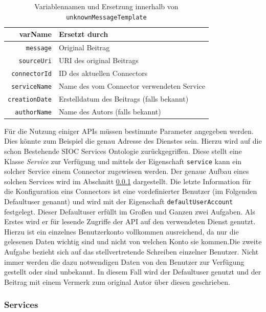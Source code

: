 \begin{table}[h]
\caption{Variablennamen und Ersetzung innerhalb von \texttt{unknownMessageTemplate} }
\centering
\begin{tabular}{r|l}
\textbf{varName}      & \textbf{Ersetzt durch}                     \\
\hline
\texttt{message}      & Original Beitrag                           \\
\texttt{sourceUri}    & URI des original Beitrags                  \\
\texttt{connectorId}  & ID des aktuellen Connectors                \\
\texttt{serviceName}  & Name des vom Connector verwendeten Service \\
\texttt{creationDate} & Erstelldatum des Beitrags (falls bekannt)  \\
\texttt{authorName}   & Name des Autors (falls bekannt)          
\end{tabular}
\label{tbl:unknown_message_template_vars}
\end{table}

Für die Nutzung einiger APIs müssen bestimmte Parameter angegeben werden. Dies könnte zum Beispiel die genau Adresse des Dienstes sein. Hierzu wird auf die schon Bestehende SIOC Services Ontologie zurückgegriffen. Diese stellt eine Klasse \emph{Service} zur Verfügung und mittels der Eigenschaft \texttt{service} kann ein solcher Service einem Connector zugewiesen werden. Der genaue Aufbau eines solchen Services wird im Abschnitt \ref{ssub:services} dargestellt. Die letzte Information für die Konfiguration eins Connectors ist eine vordefinierter Benutzer (im Folgenden Defaultuser genannt) und wird mit der Eigenschaft \texttt{defaultUserAccount} festgelegt. Dieser Defaultuser erfüllt im Großen und Ganzen zwei Aufgaben. Als Erstes wird er für lesende Zugriffe der API auf den verwendeten Dienst genutzt. Hierzu ist ein einzelnes Benutzerkonto vollkommen ausreichend, da nur die gelesenen Daten wichtig sind und nicht von welchen Konto sie kommen.Die zweite Aufgabe bezieht sich auf das stellvertretende Schreiben einzelner Benutzer. Nicht immer werden die dazu notwendigen Daten von den Benutzer zur Verfügung gestellt oder sind unbekannt. In diesem Fall wird der Defaultuser genutzt und der Beitrag mit einem Vermerk zum original Autor über diesen geschrieben.


\subsubsection{Services} %
\label{ssub:services}

